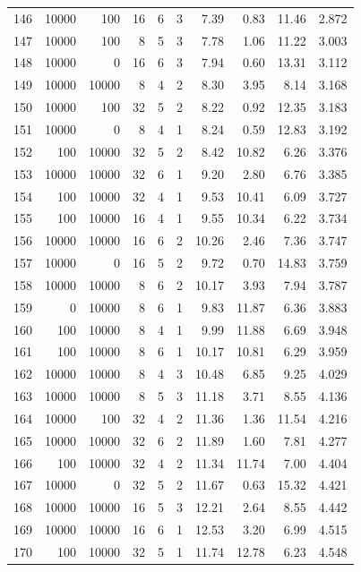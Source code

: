 \begin{footnotesize}
\begin{longtable}{@{}rrrrrrrrrr@{}}
146 & 10000 & 100 & 16 & 6 & 3 & 7.39 & 0.83 & 11.46 & 2.872 \\
147 & 10000 & 100 & 8 & 5 & 3 & 7.78 & 1.06 & 11.22 & 3.003 \\
148 & 10000 & 0 & 16 & 6 & 3 & 7.94 & 0.60 & 13.31 & 3.112 \\
149 & 10000 & 10000 & 8 & 4 & 2 & 8.30 & 3.95 & 8.14 & 3.168 \\
150 & 10000 & 100 & 32 & 5 & 2 & 8.22 & 0.92 & 12.35 & 3.183 \\
151 & 10000 & 0 & 8 & 4 & 1 & 8.24 & 0.59 & 12.83 & 3.192 \\
152 & 100 & 10000 & 32 & 5 & 2 & 8.42 & 10.82 & 6.26 & 3.376 \\
153 & 10000 & 10000 & 32 & 6 & 1 & 9.20 & 2.80 & 6.76 & 3.385 \\
154 & 100 & 10000 & 32 & 4 & 1 & 9.53 & 10.41 & 6.09 & 3.727 \\
155 & 100 & 10000 & 16 & 4 & 1 & 9.55 & 10.34 & 6.22 & 3.734 \\
156 & 10000 & 10000 & 16 & 6 & 2 & 10.26 & 2.46 & 7.36 & 3.747 \\
157 & 10000 & 0 & 16 & 5 & 2 & 9.72 & 0.70 & 14.83 & 3.759 \\
158 & 10000 & 10000 & 8 & 6 & 2 & 10.17 & 3.93 & 7.94 & 3.787 \\
159 & 0 & 10000 & 8 & 6 & 1 & 9.83 & 11.87 & 6.36 & 3.883 \\
160 & 100 & 10000 & 8 & 4 & 1 & 9.99 & 11.88 & 6.69 & 3.948 \\
161 & 100 & 10000 & 8 & 6 & 1 & 10.17 & 10.81 & 6.29 & 3.959 \\
162 & 10000 & 10000 & 8 & 4 & 3 & 10.48 & 6.85 & 9.25 & 4.029 \\
163 & 10000 & 10000 & 8 & 5 & 3 & 11.18 & 3.71 & 8.55 & 4.136 \\
164 & 10000 & 100 & 32 & 4 & 2 & 11.36 & 1.36 & 11.54 & 4.216 \\
165 & 10000 & 10000 & 32 & 6 & 2 & 11.89 & 1.60 & 7.81 & 4.277 \\
166 & 100 & 10000 & 32 & 4 & 2 & 11.34 & 11.74 & 7.00 & 4.404 \\
167 & 10000 & 0 & 32 & 5 & 2 & 11.67 & 0.63 & 15.32 & 4.421 \\
168 & 10000 & 10000 & 16 & 5 & 3 & 12.21 & 2.64 & 8.55 & 4.442 \\
169 & 10000 & 10000 & 16 & 6 & 1 & 12.53 & 3.20 & 6.99 & 4.515 \\
170 & 100 & 10000 & 32 & 5 & 1 & 11.74 & 12.78 & 6.23 & 4.548 \\

\end{longtable}
\end{footnotesize}

